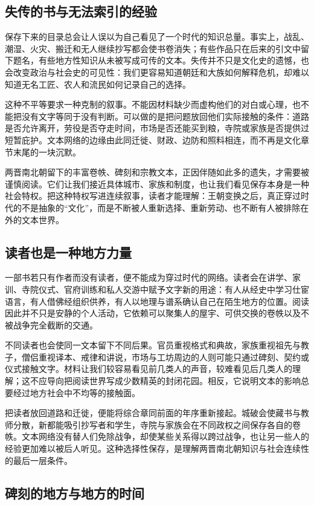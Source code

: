 \subsection{失传的书与无法索引的经验}

保存下来的目录总会让人误以为自己看见了一个时代的知识总量。事实上，战乱、潮湿、火灾、搬迁和无人继续抄写都会使书卷消失；有些作品只在后来的引文中留下题名，有些地方性知识从未被写成可传的文本。失传并不只是文化史的遗憾，也会改变政治与社会史的可见性：我们更容易知道朝廷和大族如何解释危机，却难以知道无名工匠、农人和流民如何记录自己的选择。

这种不平等要求一种克制的叙事。不能因材料缺少而虚构他们的对白或心理，也不能把没有文字等同于没有判断。可以做的是把问题放回他们实际接触的条件：道路是否允许离开，劳役是否夺走时间，市场是否还能买到粮，寺院或家族是否提供过短暂庇护。文本网络的边缘由此同迁徙、财政、边防和照料相连，而不再是文化章节末尾的一块沉默。

两晋南北朝留下的丰富卷帙、碑刻和宗教文本，正因伴随如此多的遗失，才需要被谨慎阅读。它们让我们接近具体城市、家族和制度，也让我们看见保存本身是一种社会特权。把这种特权写进连续叙事，读者才能理解：王朝变换之后，真正穿过时代的不是抽象的“文化”，而是不断被人重新选择、重新劳动、也不断有人被排除在外的文本世界。

\subsection{读者也是一种地方力量}

一部书若只有作者而没有读者，便不能成为穿过时代的网络。读者会在讲学、家训、寺院仪式、官府训练和私人交游中赋予文字新的用途：有人从经史中学习仕宦语言，有人借佛经组织供养，有人以地理与谱系确认自己在陌生地方的位置。阅读因此并不只是安静的个人活动，它依赖可以聚集人的屋宇、可供交换的卷帙以及不被战争完全截断的交通。

不同读者也会使同一文本留下不同后果。官员重视格式和典故，家族重视祖先与教子，僧侣重视译本、戒律和讲说，市场与工坊周边的人则可能只通过碑刻、契约或仪式接触文字。材料让我们较容易看见前几类人的声音，较难看见后几类人的理解；这不应导向把阅读世界写成少数精英的封闭花园。相反，它说明文本的影响总要经过地方社会中不均等的接触面。

把读者放回道路和迁徙，便能将综合章同前面的年序重新接起。城破会使藏书与教师分散，新都能吸引抄写者和学生，寺院与家族会在不同政权之间保存各自的卷帙。文本网络没有替人们免除战争，却使某些关系得以跨过战争，也让另一些人的经验更加难以被后人听见。这种选择性保存，是理解两晋南北朝知识与社会连续性的最后一层条件。

\subsection{碑刻的地方与地方的时间}

